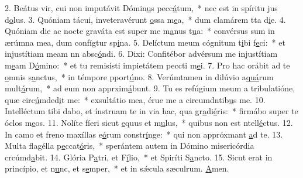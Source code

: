 2. Beátus vir, cui non imputávit Dómin\uline{u}s pecc\uline{á}tum,~* nec est in spíritu jus d\uline{o}lus.
3. Quóniam tácui, inveteravérunt \uline{o}ssa m\uline{e}a,~* dum clamárem tta d\uline{i}e.
4. Quóniam die ac nocte graváta est super me m\uline{a}nus t\uline{u}a:~* convérsus sum in ærúmna mea, dum confígtur sp\uline{i}na.
5. Delíctum meum cógnitum t\uline{i}bi f\uline{e}ci:~* et injustítiam meam nn absc\uline{ó}ndi.
6. Dixi: Confitébor advérsum me injustítiam m\uline{e}am D\uline{ó}mino:~* et tu remisísti impietátem peccti m\uline{e}i.
7. Pro hac orábit ad te \uline{o}mnis s\uline{a}nctus,~* in témpore pport\uline{ú}no.
8. Verúmtamen in dilúvio a\uline{quá}rum mult\uline{á}rum,~* ad eum non apprxim\uline{á}bunt.
9. Tu es refúgium meum a tribulatióne, quæ circ\uline{ú}mded\uline{i}t me:~* exsultátio mea, érue me a circumdntib\uline{u}s me.
10. Intelléctum tibi dabo, et ínstruam te in via hac, qua gr\uline{a}di\uline{é}ris:~* firmábo super te óclos m\uline{e}os.
11. Nolíte fíeri sicut \uline{e}quus et m\uline{u}lus,~* quibus non est ntell\uline{é}ctus.
12. In camo et freno maxíllas e\uline{ó}rum constr\uline{í}nge:~* qui non appróxmant \uline{a}d te.
13. Multa flagélla p\uline{e}ccat\uline{ó}ris,~* sperántem autem in Dómino misericórdia crcúmd\uline{a}bit.
14. Glória P\uline{a}tri, et F\uline{í}lio,~* et Spiríti S\uline{a}ncto.
15. Sicut erat in princípio, et n\uline{u}nc, et s\uline{e}mper,~* et in sǽcula sæculrum. \uline{A}men.
